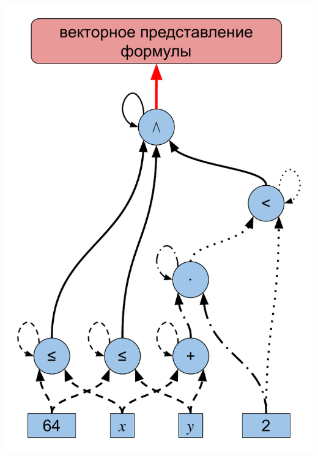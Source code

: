\documentclass[14pt,aspectratio=169,hyperref={pdftex,unicode},xcolor=dvipsnames]{beamer}
\begin{document}
\begin{frame}[noframenumbering]

\begin{center}
  \includegraphics[scale=0.45]{./assets/formula-ast-talk-5.pdf}
\end{center}

\end{frame}
\end{document}
